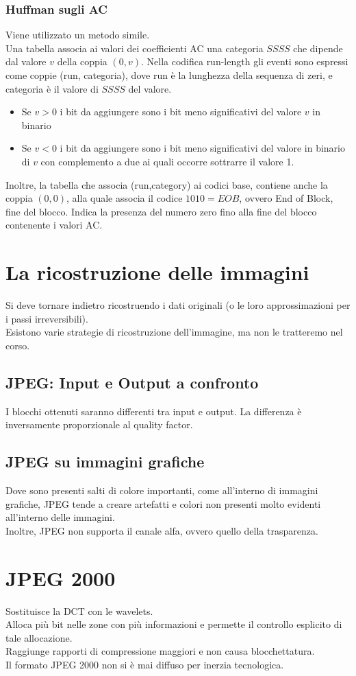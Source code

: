 \documentclass{report}
\begin{document}
	\subsubsection{Huffman sugli AC}
	Viene utilizzato un metodo simile.\\
	Una tabella associa ai valori dei coefficienti AC una categoria $SSSS$ che dipende dal valore $v$ della coppia $(0,v)$. Nella codifica run-length gli eventi sono espressi come coppie (run, categoria), dove run è la lunghezza della sequenza di zeri, e categoria è il valore di $SSSS$ del valore.
	\begin{itemize}
		\item Se $v>0$ i bit da aggiungere sono i bit meno significativi del valore $v$ in binario
		      		      
		\item Se $v<0$ i bit da aggiungere sono i bit meno significativi del valore in binario di $v$ con complemento a due ai quali occorre sottrarre il valore 1.
	\end{itemize}
	Inoltre, la tabella che associa (run,category) ai codici base, contiene anche la coppia $(0,0)$, alla quale associa il codice $1010 = EOB$, ovvero End of Block, fine del blocco. Indica la presenza del numero zero fino alla fine del blocco contenente i valori AC.
	\section{La ricostruzione delle immagini}
	Si deve tornare indietro ricostruendo i dati originali (o le loro approssimazioni per i passi irreversibili).\\
	Esistono varie strategie di ricostruzione dell'immagine, ma non le tratteremo nel corso.
		
	\subsection{JPEG: Input e Output a confronto}
	I blocchi ottenuti saranno differenti tra input e output. La differenza è inversamente proporzionale al quality factor.
		
	\subsection{JPEG su immagini grafiche}
	Dove sono presenti salti di colore importanti, come all'interno di immagini grafiche, JPEG tende a creare artefatti e colori non presenti molto evidenti all'interno delle immagini.\\
	Inoltre, JPEG non supporta il canale alfa, ovvero quello della trasparenza.
		
	\section{JPEG 2000}
	Sostituisce la DCT con le wavelets.\\
	Alloca più bit nelle zone con più informazioni e permette il controllo esplicito di tale allocazione.\\
	Raggiunge rapporti di compressione maggiori e non causa blocchettatura.\\
	Il formato JPEG 2000 non si è mai diffuso per inerzia tecnologica.
\end{document}
